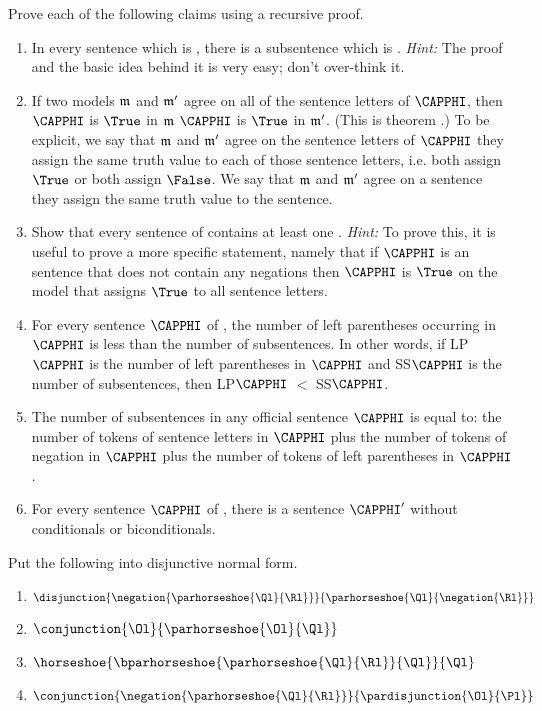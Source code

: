 Prove each of the following claims using a recursive proof. 
\begin{enumerate}
\item In every \GSL{} sentence which is , there is a subsentence which is . \emph{Hint:} The proof and the basic idea behind it is very easy; don't over-think it. 
\item\label{localityoftruth} If two models $\mathfrak{m}$ and $\mathfrak{m}'$ agree on all of the sentence letters of $\CAPPHI$, then $\CAPPHI$ is $\True$ in $\mathfrak{m}$ \Iff $\CAPPHI$ is $\True$ in $\mathfrak{m}'$. (This is theorem .) To be explicit, we say that $\mathfrak{m}$ and $\mathfrak{m}'$ agree on the sentence letters of $\CAPPHI$ \Iff they assign the same truth value to each of those sentence letters, i.e. both assign $\True$ or both assign $\False$. We say that $\mathfrak{m}$ and $\mathfrak{m}'$ agree on a sentence \Iff they assign the same truth value to the sentence.
\item Show that every  sentence of \GSL{} contains at least one \mention{$\NEGATION$}. \emph{Hint:}
To prove this, it is useful to prove a more specific statement, namely that if $\CAPPHI$ is an \GSL{} sentence that does not contain any negations then $\CAPPHI$ is $\True$ on the model that assigns $\True$ to all sentence letters.
\item For every sentence $\CAPPHI$ of \GSL{}, the number of left parentheses occurring in $\CAPPHI$ is less than the number of subsentences. In other words, if LP$\CAPPHI$ is the number of left parentheses in $\CAPPHI$ and SS$\CAPPHI$ is the number of subsentences, then LP$\CAPPHI$ $<$ SS$\CAPPHI$.
\item The number of subsentences in any official \GSL{} sentence $\CAPPHI$ is equal to: the number of tokens of sentence letters in $\CAPPHI$ plus the number of tokens of negation in $\CAPPHI$ plus the number of tokens of left parentheses in $\CAPPHI$.
\item For every sentence $\CAPPHI$ of \GSL{}, there is a  sentence $\CAPPHI'$ without conditionals or biconditionals.
\end{enumerate}

Put the following into disjunctive normal form.
\begin{multicols}{2}
\begin{enumerate}
\item {$\disjunction{\negation{\parhorseshoe{\Ql}{\Rl}}}{\parhorseshoe{\Ql}{\negation{\Rl}}}$}
\item {$\conjunction{\Ol}{\parhorseshoe{\Ol}{\Ql}}$}
\item {$\horseshoe{\bparhorseshoe{\parhorseshoe{\Ql}{\Rl}}{\Ql}}{\Ql}$}
\item {$\conjunction{\negation{\parhorseshoe{\Ql}{\Rl}}}{\pardisjunction{\Ol}{\Pl}}$}
\end{enumerate}
\end{multicols}



